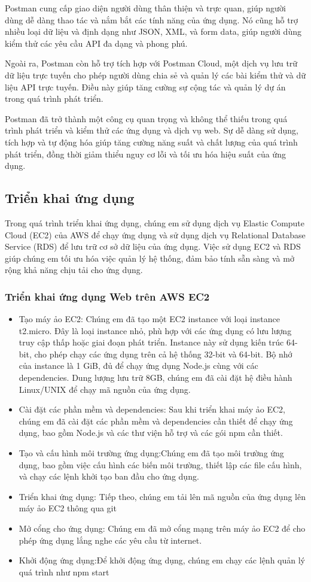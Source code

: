 Postman cung cấp giao diện người dùng thân thiện và trực quan, giúp người dùng dễ dàng thao tác và nắm bắt các tính năng của ứng dụng. Nó cũng hỗ trợ nhiều loại dữ liệu và định dạng như JSON, XML, và form data, giúp người dùng kiểm thử các yêu cầu API đa dạng và phong phú.

Ngoài ra, Postman còn hỗ trợ tích hợp với Postman Cloud, một dịch vụ lưu trữ dữ liệu trực tuyến cho phép người dùng chia sẻ và quản lý các bài kiểm thử và dữ liệu API trực tuyến. Điều này giúp tăng cường sự cộng tác và quản lý dự án trong quá trình phát triển.

Postman đã trở thành một công cụ quan trọng và không thể thiếu trong quá trình phát triển và kiểm thử các ứng dụng và dịch vụ web. Sự dễ dàng sử dụng, tích hợp và tự động hóa giúp tăng cường năng suất và chất lượng của quá trình phát triển, đồng thời giảm thiểu nguy cơ lỗi và tối ưu hóa hiệu suất của ứng dụng.

\subsection{Triển khai ứng dụng}
Trong quá trình triển khai ứng dụng, chúng em sử dụng dịch vụ Elastic Compute
 Cloud (EC2) của AWS để chạy ứng dụng và sử dụng dịch vụ Relational Database Service
  (RDS) để lưu trữ cơ sở dữ liệu của ứng dụng. Việc sử dụng EC2 và RDS giúp
   chúng em tối ưu hóa việc quản lý hệ thống, đảm bảo tính sẵn sàng và
    mở rộng khả năng chịu tải cho ứng dụng.

\subsubsection{Triển khai ứng dụng Web trên AWS EC2}
\begin{itemize}
  \item Tạo máy ảo EC2: Chúng em đã tạo một EC2 instance với loại instance t2.micro. Đây là loại instance nhỏ, phù hợp với các ứng dụng có lưu lượng truy cập thấp hoặc giai đoạn phát triển. Instance này sử dụng kiến trúc 64-bit, cho phép chạy các ứng dụng trên cả hệ thống 32-bit và 64-bit. Bộ nhớ của instance là 1 GiB, đủ để chạy ứng dụng Node.js cùng với các dependencies. Dung lượng lưu trữ 8GB, chúng em đã cài đặt hệ điều hành Linux/UNIX để chạy mã nguồn của ứng dụng.
  \item Cài đặt các phần mềm và dependencies: Sau khi triển khai máy ảo EC2, chúng em đã cài đặt các phần mềm và dependencies cần thiết để chạy ứng dụng, bao gồm Node.js và các thư viện hỗ trợ và các gói npm cần thiết.
  \item Tạo và cấu hình môi trường ứng dụng:Chúng em đã tạo môi trường ứng dụng, bao gồm việc cấu hình các biến môi trường, thiết lập các file cấu hình, và chạy các lệnh khởi tạo ban đầu cho ứng dụng.
  \item Triển khai ứng dụng: Tiếp theo, chúng em tải lên mã nguồn của ứng dụng lên máy ảo EC2 thông qua git
  \item Mở cổng cho ứng dụng: Chúng em đã mở cổng mạng trên máy ảo EC2 để cho phép ứng dụng lắng nghe các yêu cầu từ internet.
  \item Khởi động ứng dụng:Để khởi động ứng dụng, chúng em chạy các lệnh quản lý quá trình như npm start
\end{itemize}

